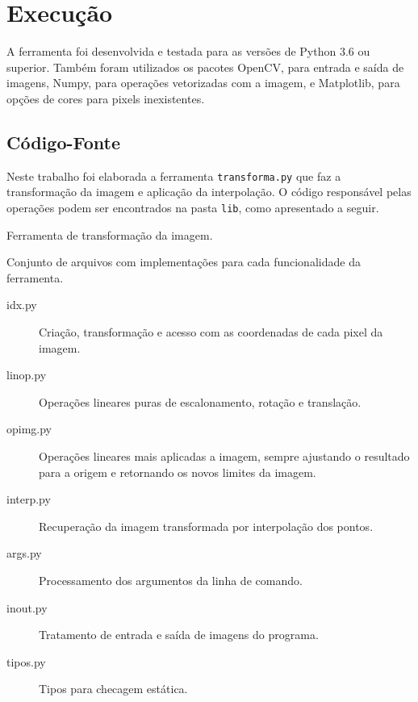 \section{Execução} \label{sec:programa}


A ferramenta foi desenvolvida e testada para as versões de Python 3.6 ou superior. Também foram utilizados os pacotes OpenCV, para entrada e saída de imagens, Numpy, para operações vetorizadas com a imagem, e Matplotlib, para opções de cores para pixels inexistentes.

\subsection{Código-Fonte}

    Neste trabalho foi elaborada a ferramenta \texttt{transforma.py} que faz a transformação da imagem e aplicação da interpolação. O código responsável pelas operações podem ser encontrados na pasta \texttt{lib}, como apresentado a seguir.

    \begin{description}[leftmargin = 1.5em]

        \item[transforma.py] Ferramenta de transformação da imagem.

        \item[lib] Conjunto de arquivos com implementações para cada funcionalidade da ferramenta.

        \begin{description}

            \item[idx.py] Criação, transformação e acesso com as coordenadas de cada pixel da imagem.

            \item[linop.py] Operações lineares puras de escalonamento, rotação e translação.

            \item[opimg.py] Operações lineares mais aplicadas a imagem, sempre ajustando o resultado para a origem e retornando os novos limites da imagem.

            \item[interp.py] Recuperação da imagem transformada por interpolação dos pontos.

            \item[args.py] Processamento dos argumentos da linha de comando.

            \item[inout.py] Tratamento de entrada e saída de imagens do programa.

            \item[tipos.py] Tipos para checagem estática.
        \end{description}
    \end{description}

